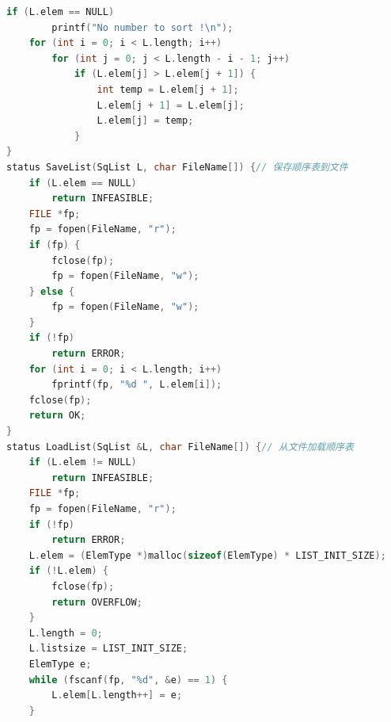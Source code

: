 \documentclass[supercite]{Experimental_Report}
\theoremstyle{definition}
\begin{document}
\begin{lstlisting}[language=c]
    if (L.elem == NULL)
        printf("No number to sort !\n");
    for (int i = 0; i < L.length; i++)
        for (int j = 0; j < L.length - i - 1; j++)
            if (L.elem[j] > L.elem[j + 1]) {
                int temp = L.elem[j + 1];
                L.elem[j + 1] = L.elem[j];
                L.elem[j] = temp;
            }
}
status SaveList(SqList L, char FileName[]) {// 保存顺序表到文件
    if (L.elem == NULL)
        return INFEASIBLE;
    FILE *fp;
    fp = fopen(FileName, "r");
    if (fp) {
        fclose(fp);
        fp = fopen(FileName, "w");
    } else {
        fp = fopen(FileName, "w");
    }
    if (!fp)
        return ERROR;
    for (int i = 0; i < L.length; i++)
        fprintf(fp, "%d ", L.elem[i]);
    fclose(fp);
    return OK;
}
status LoadList(SqList &L, char FileName[]) {// 从文件加载顺序表
    if (L.elem != NULL)
        return INFEASIBLE;
    FILE *fp;
    fp = fopen(FileName, "r");
    if (!fp)
        return ERROR;
    L.elem = (ElemType *)malloc(sizeof(ElemType) * LIST_INIT_SIZE);
    if (!L.elem) {
        fclose(fp);
        return OVERFLOW;
    }
    L.length = 0;
    L.listsize = LIST_INIT_SIZE;
    ElemType e;
    while (fscanf(fp, "%d", &e) == 1) {
        L.elem[L.length++] = e;
    }


\end{lstlisting}
\end{document}
